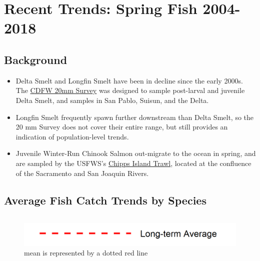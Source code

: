 \documentclass[
]{book}
\providecommand{\tightlist}{%
  \setlength{\itemsep}{0pt}\setlength{\parskip}{0pt}}
\begin{document}
\hypertarget{recent-trends-spring-fish-2004-2018}{%
\section{Recent Trends: Spring Fish 2004-2018}\label{recent-trends-spring-fish-2004-2018}}

\hypertarget{background-5}{%
\subsection{Background}\label{background-5}}

\begin{itemize}
\tightlist
\item
  Delta Smelt and Longfin Smelt have been in decline since the early 2000s. The \href{https://wildlife.ca.gov/Conservation/Delta/20mm-Survey}{CDFW 20mm Survey} was designed to sample post-larval and juvenile Delta Smelt, and samples in San Pablo, Suisun, and the Delta.
\item
  Longfin Smelt frequently spawn further downstream than Delta Smelt, so the 20 mm Survey does not cover their entire range, but still provides an indication of population-level trends.
\item
  Juvenile Winter-Run Chinook Salmon out-migrate to the ocean in spring, and are sampled by the USFWS's \href{https://www.fws.gov/lodi/juvenile_fish_monitoring_program/jfmp_index.htm}{Chipps Island Trawl}, located at the confluence of the Sacramento and San Joaquin Rivers.
\end{itemize}

\hypertarget{average-fish-catch-trends-by-species-1}{%
\subsection{Average Fish Catch Trends by Species}\label{average-fish-catch-trends-by-species-1}}

\begin{columns-nocenter}

\begin{column}

\begin{figure}
\includegraphics[width=15.25in]{figures/mline} \caption{mean is represented by a dotted red line}\label{fig:unnamed-chunk-39}
\end{figure}

\end{column}

\begin{column}

\end{column}

\begin{column}

\end{column}

\end{columns-nocenter}
\end{document}
